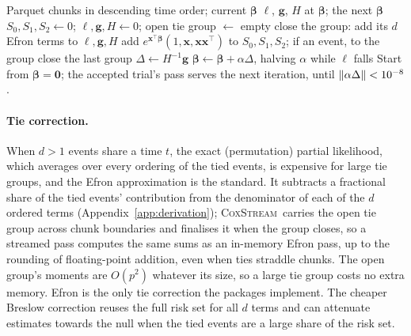 \documentclass[11pt,a4paper]{article}
\newcommand{\coxstream}{\textsc{CoxStream}}
\begin{document}
\begin{algorithm}[t]
\caption{One streamed pass at $\boldsymbol\beta$, and the Newton--Raphson step}
\label{alg:coxstream}
\begin{algorithmic}[1]
\Require Parquet chunks in descending time order; current $\boldsymbol\beta$
\Ensure $\ell$, $\mathbf{g}$, $H$ at $\boldsymbol\beta$; the next $\boldsymbol\beta$
\State $S_0, S_1, S_2 \gets 0$; \quad $\ell, \mathbf{g}, H \gets 0$; \quad open tie group $\gets$ empty
            \State close the group: add its $d$ Efron terms to $\ell,\mathbf{g},H$
        \EndIf
        \State add $e^{\mathbf{x}^\top\boldsymbol\beta}(1,\mathbf{x},\mathbf{x}\mathbf{x}^\top)$ to $S_0,S_1,S_2$; if an event, to the group
    \EndFor
\EndFor
\State close the last group
\State $\Delta \gets H^{-1}\mathbf{g}$ 
\State $\boldsymbol\beta \gets \boldsymbol\beta + \alpha\Delta$, halving $\alpha$ while $\ell$ falls
\Statex Start from $\boldsymbol\beta = \mathbf{0}$; the accepted trial's pass
        serves the next iteration, until $\lVert\alpha\Delta\rVert < 10^{-8}$.
\end{algorithmic}
\end{algorithm}

\paragraph{Tie correction.} When $d>1$ events share a time $t$, the exact
(permutation) partial likelihood, which averages over every ordering of the
tied events, is expensive for large tie groups, and the Efron approximation
\citep{efron1977efficiency} is the standard. It subtracts a fractional share of
the tied events' contribution from the denominator of each of the $d$ ordered
terms (Appendix~\ref{app:derivation}); \coxstream\ carries the open tie group
across chunk boundaries and finalises it when the group closes, so a streamed
pass computes the same sums as an in-memory Efron pass, up to the rounding of
floating-point addition, even when ties straddle chunks. The open group's moments are $O(p^2)$ whatever its size,
so a large tie group costs no extra memory. Efron is the only tie correction
the packages implement. The cheaper Breslow correction
\citep{breslow1974covariance} reuses the full risk set for all $d$ terms and
can attenuate estimates towards the null when the tied events are a large
share of the risk set.
\end{document}
